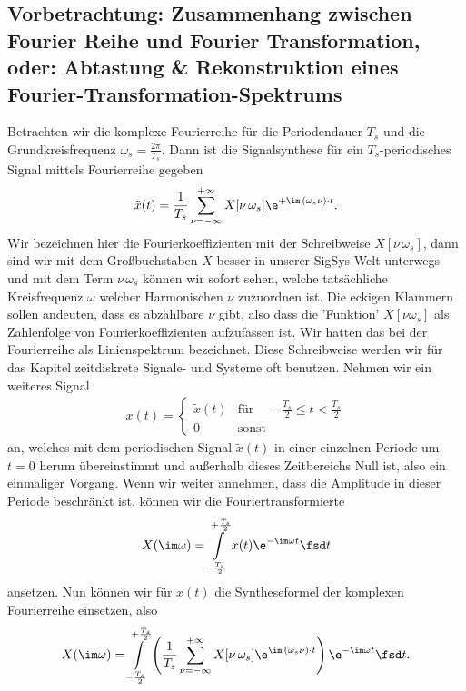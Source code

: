 \subsection*{Vorbetrachtung: Zusammenhang zwischen Fourier Reihe und Fourier
Transformation,
oder:
Abtastung \& Rekonstruktion eines Fourier-Transformation-Spektrums}
%
Betrachten wir die komplexe Fourierreihe für die Periodendauer
$T_s$ und die Grundkreisfrequenz $\omega_s=\frac{2\pi}{T_s}$.
Dann ist die Signalsynthese für ein $T_s$-periodisches Signal mittels Fourierreihe
gegeben %
\begin{align}
  \tilde{x}(t) = \frac{1}{T_s}\sum_{\nu=-\infty}^{+\infty} X[\nu\,\omega_s]
  \e^{+\im\,(\omega_s \nu)\cdot t}.
\end{align}
Wir bezeichnen hier die Fourierkoeffizienten mit der Schreibweise
$X[\nu\,\omega_s]$,
dann sind wir mit dem Großbuchstaben $X$ besser in unserer SigSys-Welt unterwegs und mit
dem Term $\nu\,\omega_s$ können wir sofort sehen,
welche tatsächliche Kreisfrequenz $\omega$ welcher Harmonischen $\nu$ zuzuordnen ist.
Die eckigen Klammern sollen andeuten, dass
es abzählbare $\nu$ gibt, also dass die 'Funktion' $X[\nu\omega_s]$
als Zahlenfolge von Fourierkoeffizienten aufzufassen ist.
Wir hatten das bei der Fourierreihe
als Linienspektrum bezeichnet.
Diese Schreibweise werden wir für das Kapitel zeitdiskrete
Signale- und Systeme oft benutzen.
%
Nehmen wir ein weiteres Signal
\begin{align}
  x(t) =
  \begin{cases}
  \tilde{x}(t)&\text{für}\quad-\frac{T_s}{2} \leq t < \frac{T_s}{2}\\
  0&\text{sonst}
  \end{cases}
\end{align}
an, welches mit dem periodischen Signal $\tilde{x}(t)$
in einer einzelnen Periode um $t=0$ herum übereinstimmt
und außerhalb dieses Zeitbereichs Null ist, also ein einmaliger Vorgang.
Wenn wir weiter annehmen, dass die Amplitude in dieser Periode beschränkt ist,
können wir die Fouriertransformierte
\begin{align}
  X(\im\omega) = \int\limits_{-\frac{T_s}{2}}^{+\frac{T_s}{2}} x(t) \e^{-\im\omega t} \fsd t
\end{align}
ansetzen.
Nun können wir für $x(t)$ die Syntheseformel der komplexen Fourierreihe einsetzen,
also
\begin{align}
X(\im\omega) = \int\limits_{-\frac{T_s}{2}}^{+\frac{T_s}{2}}
\left(\frac{1}{T_s}\sum_{\nu=-\infty}^{+\infty} X[\nu\,\omega_s] \e^{\im\,(\omega_s \nu)\cdot t}\right)
\e^{-\im\omega t} \fsd t.
\end{align}
